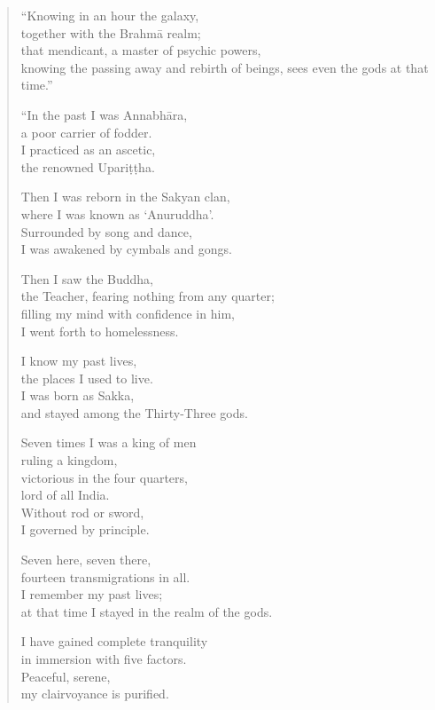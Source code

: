 \documentclass[12pt,openany]{book}%
\begin{document}
\begin{verse}
“Knowing in an hour the galaxy, \\
together with the \textsanskrit{Brahmā} realm; \\
that mendicant, a master of psychic powers, \\
knowing the passing away and rebirth of beings, sees even the gods at that time.” 

“In the past I was \textsanskrit{Annabhāra}, \\
a poor carrier of fodder. \\
I practiced as an ascetic, \\
the renowned \textsanskrit{Upariṭṭha}. 

Then I was reborn in the Sakyan clan, \\
where I was known as ‘Anuruddha’. \\
Surrounded by song and dance, \\
I was awakened by cymbals and gongs. 

Then I saw the Buddha, \\
the Teacher, fearing nothing from any quarter; \\
filling my mind with confidence in him, \\
I went forth to homelessness. 

I know my past lives, \\
the places I used to live. \\
I was born as Sakka, \\
and stayed among the Thirty-Three gods. 

Seven times I was a king of men \\
ruling a kingdom, \\
victorious in the four quarters, \\
lord of all India. \\
Without rod or sword, \\
I governed by principle. 

Seven here, seven there, \\
fourteen transmigrations in all. \\
I remember my past lives; \\
at that time I stayed in the realm of the gods. 

I have gained complete tranquility \\
in immersion with five factors. \\
Peaceful, serene, \\
my clairvoyance is purified. 


\end{verse}
\end{document}
